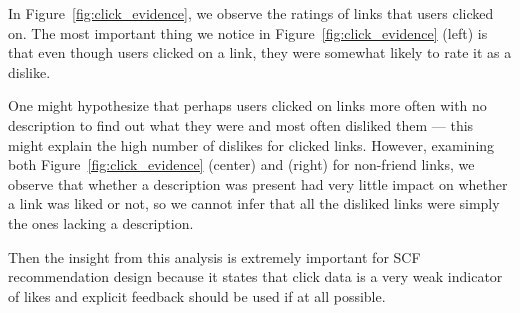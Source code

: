 In Figure~\ref{fig:click_evidence}, we observe the ratings of links
that users clicked on.  The most important thing we notice in 
Figure~\ref{fig:click_evidence} (left) is that even though users
clicked on a link, they were somewhat likely to rate it as a dislike.

One might hypothesize that perhaps users clicked on links more often with
no description to find out what they were and most often disliked them ---
this might explain the high number of dislikes for clicked links.  However,
examining both 
Figure~\ref{fig:click_evidence} (center) and (right)
for non-friend links, we observe that whether a description was present
had very little impact on whether a link was liked or not, so we cannot
infer that all the disliked links were simply the ones lacking a description.

Then the insight from this analysis is extremely important 
for SCF recommendation design because it states that click data is a very
weak indicator of likes and explicit feedback should be used if at all
possible.

